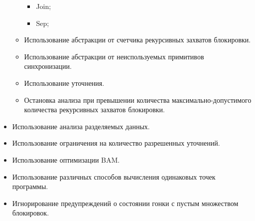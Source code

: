 \begin{itemize}
\begin{itemize}
\begin{itemize}
\item Join;
\item Sep;
\end{itemize}
\item Использование абстракции от счетчика рекурсивных захватов блокировки.
\item Использование абстракции от неиспользуемых примитивов синхронизации.
\item Использование уточнения.
\item Остановка анализа при превышении количества максимально-допустимого количества рекурсивных захватов блокировки.
\end{itemize}
\item Использование анализа разделяемых данных.
\item Использование ограничения на количество разрешенных уточнений.
\item Использование оптимизации BAM.
\item Использование различных способов вычисления одинаковых точек программы.
\item Игнорирование предупреждений о состоянии гонки с пустым множеством блокировок.
\end{itemize}

